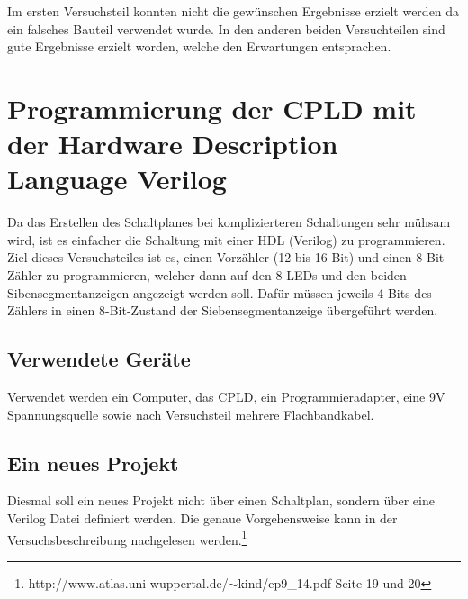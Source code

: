 \documentclass[12pt,a4paper]{article}
\begin{document}
Im ersten Versuchsteil konnten nicht die gewünschen Ergebnisse erzielt werden da ein falsches Bauteil verwendet wurde. In den anderen beiden Versuchteilen sind gute Ergebnisse erzielt worden, welche den Erwartungen entsprachen.

\section{Programmierung der CPLD mit der Hardware Description Language Verilog}
Da das Erstellen des Schaltplanes bei komplizierteren Schaltungen sehr mühsam wird, ist es einfacher die Schaltung mit einer HDL (Verilog) zu programmieren. Ziel dieses Versuchsteiles ist es, einen Vorzähler (12 bis 16 Bit) und einen 8-Bit-Zähler zu programmieren, welcher dann auf den 8 LEDs und den beiden Sibensegmentanzeigen angezeigt werden soll. Dafür müssen jeweils 4 Bits des Zählers in einen 8-Bit-Zustand der Siebensegmentanzeige übergeführt werden.
\subsection*{Verwendete Geräte}
Verwendet werden ein Computer, das CPLD, ein Programmieradapter, eine 9V Spannungsquelle sowie nach Versuchsteil mehrere Flachbandkabel.
\subsection{Ein neues Projekt}
Diesmal soll ein neues Projekt nicht über einen Schaltplan, sondern über eine Verilog Datei definiert werden.
Die genaue Vorgehensweise kann in der Versuchsbeschreibung nachgelesen werden.\footnote{http://www.atlas.uni-wuppertal.de/$\sim$kind/ep9\_14.pdf Seite 19 und 20}
\end{document}
